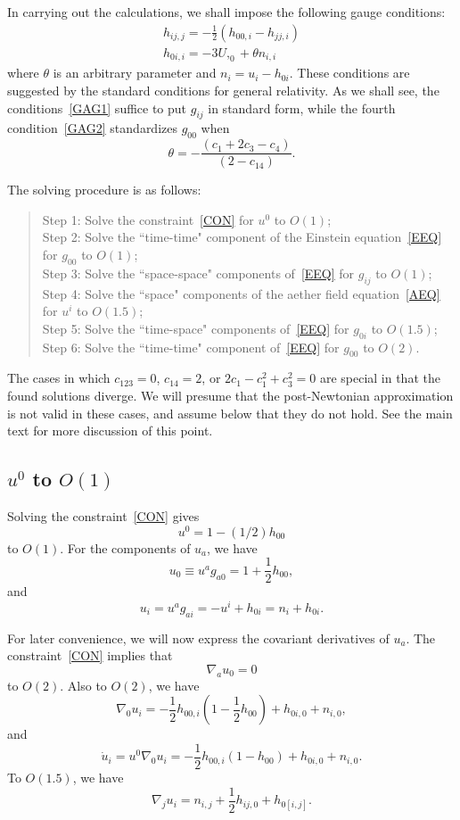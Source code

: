 \documentclass[aps,prd,preprint,amsmath,amssymb]{revtex4}
\def\beq{\begin{equation}}
\def\eeq{\end{equation}}
\def\half{\frac{1}{2}}
\begin{document}
In carrying out the calculations, we shall impose the following
gauge conditions:
%
\begin{gather}
    h_{ij,j} = -\half (h_{00,i}-h_{jj,i})\label{GAG1}\\
    h_{0i,i} = -3 U,_0+ \theta n_{i,i}\label{GAG2}
\end{gather}
%
where $\theta$ is an arbitrary parameter and $n_i = u_i - h_{0i}$.
These conditions are suggested by the standard conditions for  
general relativity.  
As we shall see, the conditions~\eqref{GAG1} suffice to put
$g_{ij}$ in standard form, while the fourth condition~\eqref{GAG2} 
standardizes
$g_{00}$ when
%
\beq
    \theta = -\frac{(c_1+2c_3-c_4)}{(2 - c_{14})}.
\eeq
%

The solving procedure is as follows:
%
\begin{verse}
Step 1: Solve the constraint~\eqref{CON} for $u^0$ to $O(1)$; \\
Step 2:    Solve the ``time-time" component of the Einstein
equation~\eqref{EEQ} for
$g_{00}$ to $O(1)$; \\
 Step 3:   Solve the ``space-space" components
of~\eqref{EEQ} for $g_{ij}$ to $O(1)$;\\
Step 4:    Solve the ``space" components of the aether field
equation~\eqref{AEQ} for $u^i$ to
$O(1.5)$; \\
  Step 5:  Solve the ``time-space" components of~\eqref{EEQ} for
$g_{0i}$ to $O(1.5)$; \\
 Step 6:   Solve the ``time-time" component
of~\eqref{EEQ} for $g_{00}$ to $O(2)$.
\end{verse}
%
The cases in which $c_{123} = 0$, $c_{14} = 2$, or $2c_1 -
c_1^2+c_3^2 = 0$ are special in that the found solutions diverge.
We will presume that the post-Newtonian approximation is not valid
in these cases, and assume below that they do not hold.  See the
main text for more discussion of this point.
%
%
%
\subsection{$u^0$ to $O(1)$}
%
Solving the constraint~\eqref{CON} gives
%
\beq\label{AEO}
    u^0 = 1 - (1/2)h_{00}
\eeq
%
to $O(1)$.  For the components of $u_a$, we have
%
\beq\label{UO}
    u_0 \equiv u^a g_{a 0} = 1 + \half h_{00},
\eeq
%
and
%
\beq
     u_i = u^a g_{a i}= -u^i + h_{0i} = n_i+h_{0i}.
\eeq
%

For later convenience, we will now express the covariant
derivatives of $u_a$.  The constraint~\eqref{CON} implies that
%
\beq
    \nabla_a u_0 = 0
\eeq
%
to $O(2)$.  Also to $O(2)$, we have
%
\beq
    \nabla_0 u_i = -\half h_{00,i}(1-\half h_{00}) + h_{0i,0} + n_{i,0},
\eeq
%
and
%
\beq
    {\dot u}_i = u^0 \nabla_0 u_i = -\half h_{00,i}(1-h_{00})
                                       + h_{0i,0}+ n_{i,0}.
\eeq
%
To $O(1.5)$, we have
%
\beq
    \nabla_j u_i = n_{i,j} + \half h_{ij,0} + h_{0[i,j]}.
\eeq
%
%
%
\end{document}
